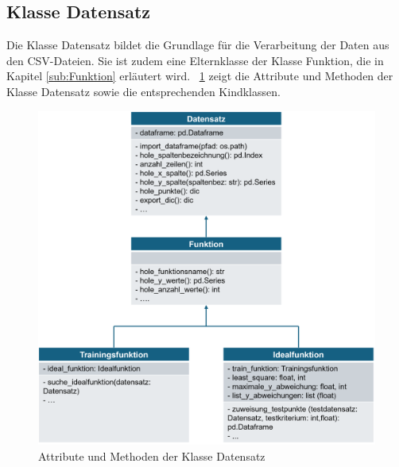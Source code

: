 \documentclass[11pt,a4paper]{scrreprt}
\newcommand{\abbildung}[1]{\figurename\ \ref{#1}}
\begin{document}
\subsection{Klasse Datensatz}
\label{sub:Datensatz}
Die Klasse Datensatz bildet die Grundlage für die Verarbeitung der Daten aus den CSV-Dateien. Sie ist zudem eine Elternklasse der Klasse Funktion, die in Kapitel \ref{sub:Funktion} erläutert wird. \abbildung{fig:Datensatz} zeigt die Attribute und Methoden der Klasse Datensatz sowie die entsprechenden Kindklassen. 
\begin{figure}[!h]
	\centering
	\includegraphics[scale=0.78]{Grafik_Klasse_Datensatz_Funktion}
	\caption{Attribute und Methoden der Klasse Datensatz}
	\label{fig:Datensatz}
\end{figure}
\end{document}

